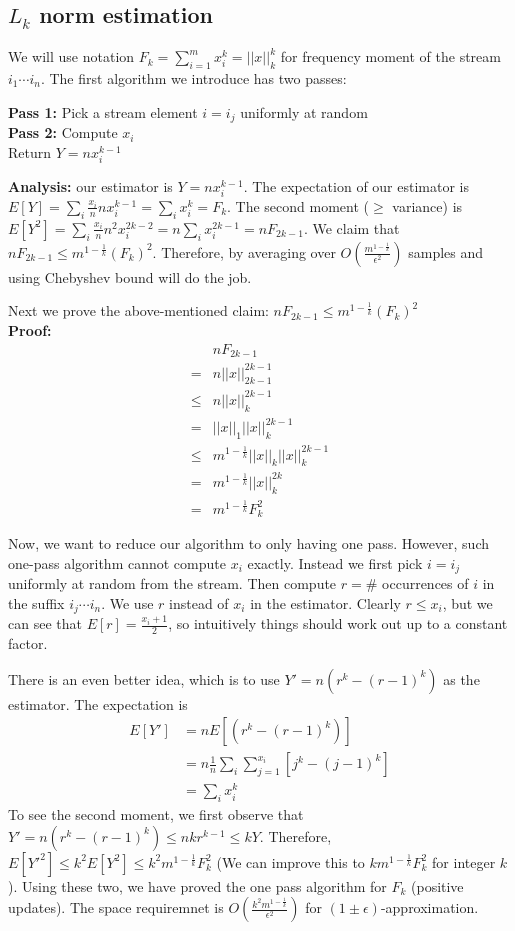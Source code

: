 \documentclass[11pt]{article}
\begin{document}
\subsection{$L_k$ norm estimation \cite{alon1996space}}
We will use notation $F_k = \sum_{i=1}^{m} x_i^k = ||x||_{k}^{k}$ for frequency moment of the stream $i_1 \cdots i_n$. The first algorithm we introduce has two passes:

\textbf{Pass 1:} Pick a stream element $i=i_j$ uniformly at random \\
\textbf{Pass 2:} Compute $x_i$ \\
Return $Y=n x_i^{k-1}$

\textbf{Analysis:} our estimator is $Y=n x_i^{k-1}$. The expectation of our estimator is $E[Y] = \sum_i \frac{x_i}{n} n x_i^{k-1} = \sum_i x_i^k = F_k$. The second moment ($\ge$ variance) is $E[Y^2] = \sum_i \frac{x_i}{n} n^2 x_i^{2k-2} = n \sum_i x_i^{2k-1} = n F_{2k-1}$. We claim that $nF_{2k-1} \le m^{1-\frac{1}{k}}(F_k)^2$. Therefore, by averaging over $O(\frac{m^{1-\frac{1}{k}}}{\epsilon^2})$ samples and using Chebyshev bound will do the job.

Next we prove the above-mentioned claim: $nF_{2k-1} \le m^{1-\frac{1}{k}}(F_k)^2$ \\
\textbf{Proof:}
\begin{align*}
      & n F_{2k-1} \\
    = & n ||x||_{2k-1}^{2k-1} \\
    \le & n ||x||_k^{2k-1} \\
    = & ||x||_1 ||x||_k^{2k-1} \\
    \le & m^{1-\frac{1}{k}}||x||_k ||x||_k^{2k-1} \\
    = & m^{1-\frac{1}{k}}||x||_k^{2k} \\
    = & m^{1-\frac{1}{k}} F_k^2
\end{align*}

Now, we want to reduce our algorithm to only having one pass. However, such one-pass algorithm cannot compute $x_i$ exactly. Instead we first pick $i = i_j$ uniformly at random from the stream. Then compute $r=\#$ occurrences of $i$ in the suffix $i_j \cdots i_n$. We use $r$ instead of $x_i$ in the estimator. Clearly $r \le x_i$, but we can see that $E[r] = \frac{x_i + 1}{2}$, so intuitively things should work out up to a constant factor. 

There is an even better idea, which is to use $Y' = n(r^k - (r-1)^k)$ as the estimator. The expectation is 
\begin{align*}
    E[Y'] & = n E[(r^k - (r-1)^k)] \\
          & = n \frac{1}{n} \sum_i \sum_{j=1}^{x_i} \left[ j^k - (j-1)^k \right] \\
          & = \sum_i x_i^k
\end{align*}
To see the second moment, we first observe that $Y' = n(r^k - (r-1)^k) \le n k r^{k-1} \le k Y$. Therefore, $E[Y'^2] \le k^2 E[Y^2] \le k^2 m^{1-\frac{1}{k}}F_k^2$ (We can improve this to $k m^{1-\frac{1}{k}}F_k^2$ for integer $k$). Using these two, we have proved the one pass algorithm for $F_k$ (positive updates). The space requiremnet is $O(\frac{k^2m^{1-\frac{1}{k}}}{\epsilon^2})$ for $(1 \pm \epsilon)$-approximation.
\end{document}
